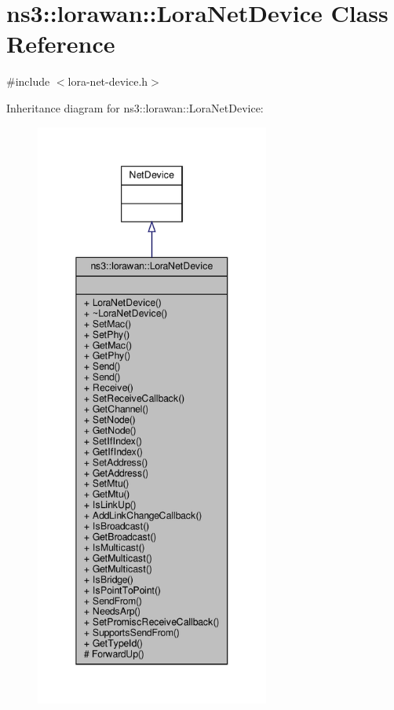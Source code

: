 \hypertarget{classns3_1_1lorawan_1_1LoraNetDevice}{}\section{ns3\+:\+:lorawan\+:\+:Lora\+Net\+Device Class Reference}
\label{classns3_1_1lorawan_1_1LoraNetDevice}


{\ttfamily \#include $<$lora-\/net-\/device.\+h$>$}



Inheritance diagram for ns3\+:\+:lorawan\+:\+:Lora\+Net\+Device\+:
\nopagebreak
\begin{figure}[H]
\begin{center}
\leavevmode
\includegraphics[height=550pt]{classns3_1_1lorawan_1_1LoraNetDevice__inherit__graph}
\end{center}
\end{figure}


